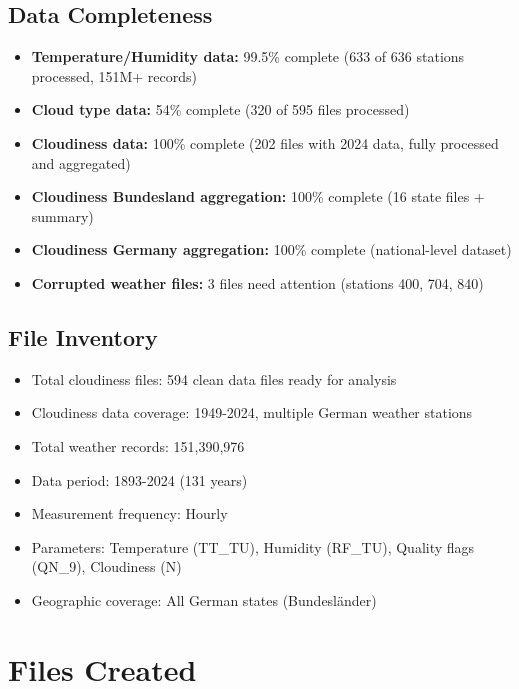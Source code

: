 \documentclass[11pt,a4paper]{article}
\begin{document}
\subsection{Data Completeness}
\begin{itemize}
    \item \textcolor{resultcolor}{\textbf{Temperature/Humidity data:}} 99.5\% complete (633 of 636 stations processed, 151M+ records)
    \item \textcolor{warningcolor}{\textbf{Cloud type data:}} 54\% complete (320 of 595 files processed)
    \item \textcolor{resultcolor}{\textbf{Cloudiness data:}} 100\% complete (202 files with 2024 data, fully processed and aggregated)
    \item \textcolor{resultcolor}{\textbf{Cloudiness Bundesland aggregation:}} 100\% complete (16 state files + summary)
    \item \textcolor{resultcolor}{\textbf{Cloudiness Germany aggregation:}} 100\% complete (national-level dataset)
    \item \textcolor{warningcolor}{\textbf{Corrupted weather files:}} 3 files need attention (stations 400, 704, 840)
\end{itemize}

\subsection{File Inventory}
\begin{itemize}
    \item Total cloudiness files: 594 clean data files ready for analysis
    \item Cloudiness data coverage: 1949-2024, multiple German weather stations
    \item Total weather records: 151,390,976
    \item Data period: 1893-2024 (131 years)
    \item Measurement frequency: Hourly
    \item Parameters: Temperature (TT\_TU), Humidity (RF\_TU), Quality flags (QN\_9), Cloudiness (N)
    \item Geographic coverage: All German states (Bundesländer)
\end{itemize}

\section{Files Created}
\end{document}
